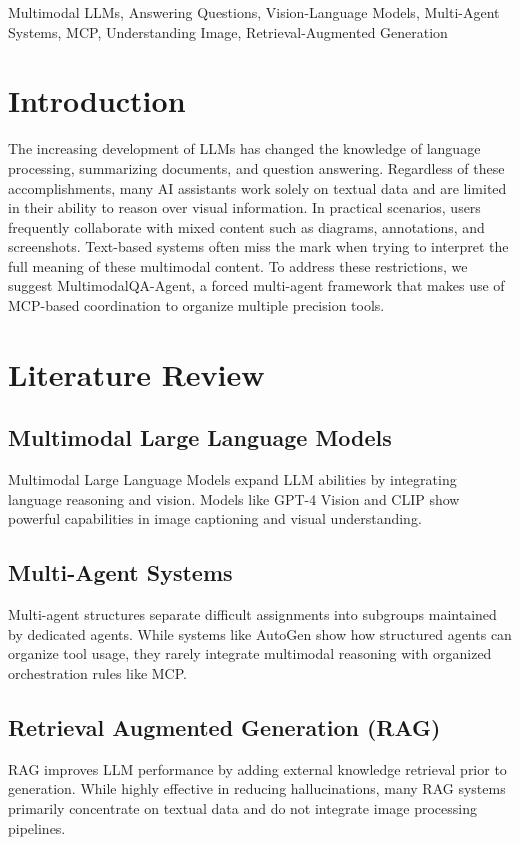 \documentclass[conference]{IEEEtran}
\begin{document}
\begin{IEEEkeywords}
Multimodal LLMs, Answering Questions, Vision-Language Models, Multi-Agent Systems, MCP, Understanding Image, Retrieval-Augmented Generation 
\end{IEEEkeywords}

\section{Introduction}
The increasing development of LLMs has changed the knowledge of language processing, summarizing documents, and question answering. Regardless of these accomplishments, many AI assistants work solely on textual data and are limited in their ability to reason over visual information. In practical scenarios, users frequently collaborate with mixed content such as diagrams, annotations, and screenshots. Text-based systems often miss the mark when trying to interpret the full meaning of these multimodal content. To address these restrictions, we suggest MultimodalQA-Agent, a forced multi-agent framework that makes use of MCP-based coordination to organize multiple precision tools.

\section{Literature Review}
\subsection{Multimodal Large Language Models}
Multimodal Large Language Models expand LLM abilities by integrating language reasoning and vision. Models like GPT-4 Vision and CLIP show powerful capabilities in image captioning and visual understanding.

\subsection{Multi-Agent Systems}
Multi-agent structures separate difficult assignments into subgroups maintained by dedicated agents. While systems like AutoGen show how structured agents can organize tool usage, they rarely integrate multimodal reasoning with organized orchestration rules like MCP.

\subsection{Retrieval Augmented Generation (RAG)}
RAG improves LLM performance by adding external knowledge retrieval prior to generation. While highly effective in reducing hallucinations, many RAG systems primarily concentrate on textual data and do not integrate image processing pipelines.
\end{document}
